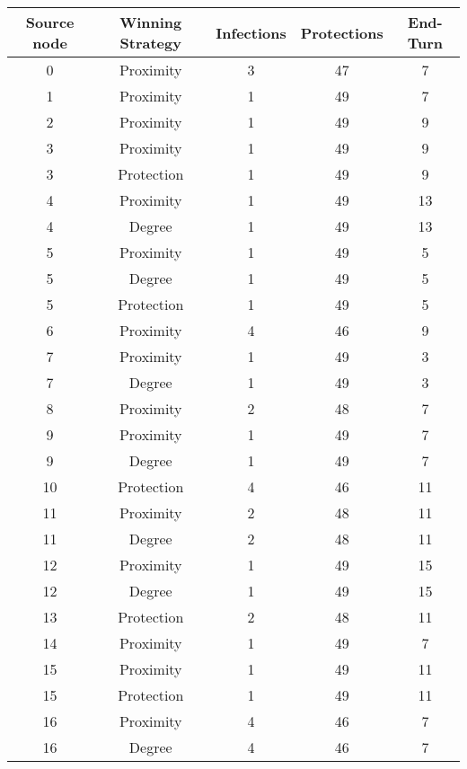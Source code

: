 \documentclass[results.tex]{subfiles}
\begin{document}
\begin{center}
  \begin{tabular}{| c || c | c | c | c |}
    \hline
    {\bfseries Source node} & {\bfseries Winning Strategy} & {\bfseries Infections} & {\bfseries Protections} & {\bfseries End-Turn} \\  %
    \hline\hline
    0 & Proximity & 3 & 47 & 7 \\ 
    \hline
    1 & Proximity & 1 & 49 & 7 \\ 
    \hline
    2 & Proximity & 1 & 49 & 9 \\ 
    \hline
    3 & Proximity & 1 & 49 & 9 \\ 
    \hline
    3 & Protection & 1 & 49 & 9 \\ 
    \hline
    4 & Proximity & 1 & 49 & 13 \\ 
    \hline
    4 & Degree & 1 & 49 & 13 \\ 
    \hline
    5 & Proximity & 1 & 49 & 5 \\ 
    \hline
    5 & Degree & 1 & 49 & 5 \\ 
    \hline
    5 & Protection & 1 & 49 & 5 \\ 
    \hline
    6 & Proximity & 4 & 46 & 9 \\ 
    \hline
    7 & Proximity & 1 & 49 & 3 \\ 
    \hline
    7 & Degree & 1 & 49 & 3 \\ 
    \hline
    8 & Proximity & 2 & 48 & 7 \\ 
    \hline
    9 & Proximity & 1 & 49 & 7 \\ 
    \hline
    9 & Degree & 1 & 49 & 7 \\ 
    \hline
    10 & Protection & 4 & 46 & 11 \\ 
    \hline
    11 & Proximity & 2 & 48 & 11 \\ 
    \hline
    11 & Degree & 2 & 48 & 11 \\ 
    \hline
    12 & Proximity & 1 & 49 & 15 \\ 
    \hline
    12 & Degree & 1 & 49 & 15 \\ 
    \hline
    13 & Protection & 2 & 48 & 11 \\ 
    \hline
    14 & Proximity & 1 & 49 & 7 \\ 
    \hline
    15 & Proximity & 1 & 49 & 11 \\ 
    \hline
    15 & Protection & 1 & 49 & 11 \\ 
    \hline
    16 & Proximity & 4 & 46 & 7 \\ 
    \hline
    16 & Degree & 4 & 46 & 7 \\ 

\end{tabular}
\end{center}
\end{document}
